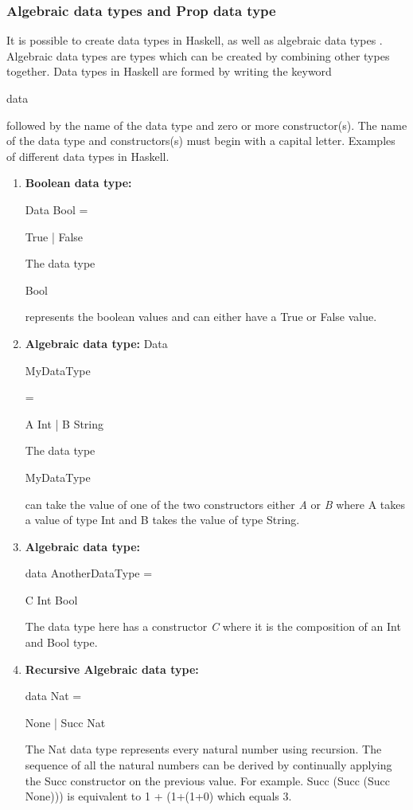 \documentclass{article}%
\begin{document}
\subsubsection{Algebraic data types and Prop data type}
It is possible to create data types in Haskell, as well as algebraic data types \cite{learnyouahaskell}. Algebraic data types are types which can be created by combining other types together.
Data types in Haskell are formed by writing the keyword \begin{myKeyWordStyle}data\end{myKeyWordStyle} followed by the name of the data type and zero or more constructor(s). The name of the data type and constructors(s) must begin with a capital letter.
Examples of different data types in Haskell.
\begin{enumerate}
\item\textbf{Boolean data type:}
\begin{myTypeNameStyle}Data Bool = \begin{myConstructorStyle}True | False\end{myConstructorStyle} \end{myTypeNameStyle}
The data type \begin{myTypeVarStyle}Bool\end{myTypeVarStyle} represents the boolean values and can either have a True or False value. 
\item\textbf{Algebraic data type:}
Data \begin{myTypeNameStyle} MyDataType \end{myTypeNameStyle} = \begin{myConstructorStyle}  A Int | B String  \end{myConstructorStyle} 
The data type \begin {myTypeVarStyle}MyDataType \end{myTypeVarStyle} can take the value of one of the two constructors either \textit{A} or \textit{B} where A takes a value of type Int and B takes the value of type String.
\item\textbf{Algebraic data type:}
\begin{myTypeNameStyle}data AnotherDataType = \begin{myConstructorStyle}C Int Bool\end{myConstructorStyle}\end{myTypeNameStyle}
The data type here has a constructor \textit{C} where it is the composition of an Int and Bool type. 
\item\textbf{Recursive Algebraic data type:}
\begin{myTypeNameStyle}data Nat = \begin{myConstructorStyle}None | Succ Nat \end{myConstructorStyle}\end{myTypeNameStyle}
The Nat data type represents every natural number using recursion. The sequence of all the natural numbers can be derived by continually applying the Succ constructor on the previous value. 
For example. Succ (Succ (Succ None))) is equivalent to 1 + (1+(1+0) which equals 3.
\end{enumerate}
\end{document}
